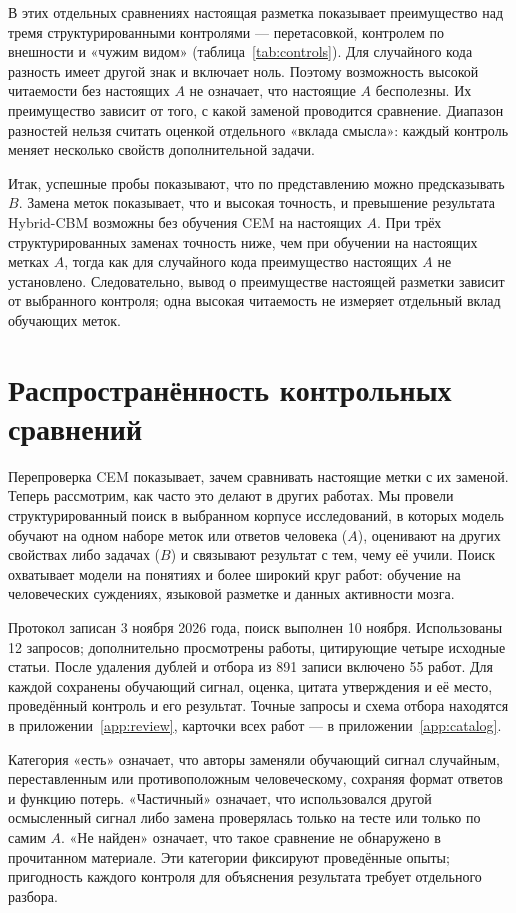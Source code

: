\documentclass[10pt]{article}
\begin{document}
В этих отдельных сравнениях настоящая разметка показывает преимущество над тремя структурированными контролями — перетасовкой, контролем по внешности и «чужим видом» (таблица~\ref{tab:controls}). Для случайного кода разность имеет другой знак и включает ноль. Поэтому возможность высокой читаемости без настоящих $A$ не означает, что настоящие $A$ бесполезны. Их преимущество зависит от того, с какой заменой проводится сравнение. Диапазон разностей нельзя считать оценкой отдельного «вклада смысла»: каждый контроль меняет несколько свойств дополнительной задачи.

Итак, успешные пробы показывают, что по представлению можно предсказывать $B$. Замена меток показывает, что и высокая точность, и превышение результата Hybrid-CBM возможны без обучения CEM на настоящих $A$. При трёх структурированных заменах точность ниже, чем при обучении на настоящих метках $A$, тогда как для случайного кода преимущество настоящих $A$ не установлено. Следовательно, вывод о преимуществе настоящей разметки зависит от выбранного контроля; одна высокая читаемость не измеряет отдельный вклад обучающих меток.

\section{Распространённость контрольных сравнений}\label{sec:prevalence}
Перепроверка CEM показывает, зачем сравнивать настоящие метки с их заменой. Теперь рассмотрим, как часто это делают в других работах. Мы провели структурированный поиск в выбранном корпусе исследований, в которых модель обучают на одном наборе меток или ответов человека ($A$), оценивают на других свойствах либо задачах ($B$) и связывают результат с тем, чему её учили. Поиск охватывает модели на понятиях и более широкий круг работ: обучение на человеческих суждениях, языковой разметке и данных активности мозга.

Протокол записан 3 ноября 2026 года, поиск выполнен 10 ноября. Использованы 12 запросов; дополнительно просмотрены работы, цитирующие четыре исходные статьи. После удаления дублей и отбора из 891 записи включено 55 работ. Для каждой сохранены обучающий сигнал, оценка, цитата утверждения и её место, проведённый контроль и его результат. Точные запросы и схема отбора находятся в приложении~\ref{app:review}, карточки всех работ --- в приложении~\ref{app:catalog}.

Категория «есть» означает, что авторы заменяли обучающий сигнал случайным, переставленным или противоположным человеческому, сохраняя формат ответов и функцию потерь. «Частичный» означает, что использовался другой осмысленный сигнал либо замена проверялась только на тесте или только по самим $A$. «Не найден» означает, что такое сравнение не обнаружено в прочитанном материале. Эти категории фиксируют проведённые опыты; пригодность каждого контроля для объяснения результата требует отдельного разбора.
\end{document}
